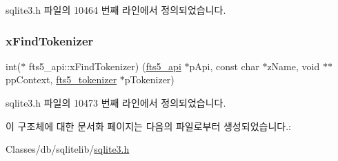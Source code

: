 sqlite3.\+h 파일의 10464 번째 라인에서 정의되었습니다.

\mbox{\label{structfts5__api_a20a23794695fa61e2892ad1243b16b67}} 
\subsubsection{\texorpdfstring{x\+Find\+Tokenizer}{xFindTokenizer}}
{\footnotesize\ttfamily int($\ast$ fts5\+\_\+api\+::x\+Find\+Tokenizer) (\hyperlink{structfts5__api}{fts5\+\_\+api} $\ast$p\+Api, const char $\ast$z\+Name, void $\ast$$\ast$pp\+Context, \hyperlink{structfts5__tokenizer}{fts5\+\_\+tokenizer} $\ast$p\+Tokenizer)}



sqlite3.\+h 파일의 10473 번째 라인에서 정의되었습니다.



이 구조체에 대한 문서화 페이지는 다음의 파일로부터 생성되었습니다.\+:\begin{DoxyCompactItemize}
\item 
Classes/db/sqlitelib/\hyperlink{sqlite3_8h}{sqlite3.\+h}\end{DoxyCompactItemize}
